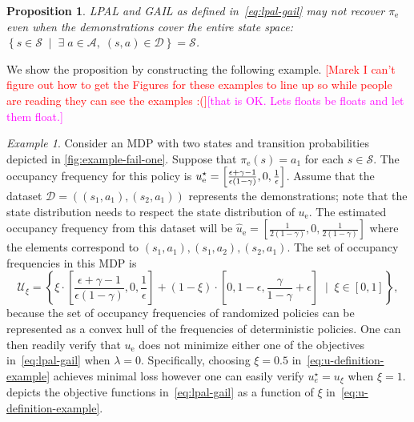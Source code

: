 \documentclass[10pt]{article}
\theoremstyle{plain}
\newtheorem{proposition}{Proposition}
\theoremstyle{remark}
\newtheorem{example}{Example}
\newcommand{\mm}[1]{\textcolor{magenta}{[#1]}}
\newcommand{\gersi}[1]{\textcolor{red}{[#1]}}
\begin{document}
\begin{proposition}
LPAL and GAIL as defined in~\eqref{eq:lpal-gail} may not recover $\pi_{\mathrm{e}}$ even when the demonstrations cover the entire state space: $ \left\{ s\in \mathcal{S} \; \mid \; \exists\; a\in \mathcal{A}, \; (s,a) \in \mathcal{D} \right\} = \mathcal{S}$. 
\end{proposition}
We show the proposition by constructing the following example.
\gersi{Marek I can't figure out how to get the Figures for these examples to line up so while people are reading they can see the examples :(}\mm{that is OK. Lets floats be floats and let them float.}
\begin{example} \label{exm:fail-all}
Consider an MDP with two states and transition probabilities depicted in \cref{fig:example-fail-one}. Suppose that $\pi_{\mathrm{e}}(s) = a_1$ for each $s\in \mathcal{S}$.  The occupancy frequency for this policy is $u^{\mathnormal{\star}}_{\mathrm{e}} = \left[ \frac{\epsilon + \gamma - 1}{\epsilon(1-\gamma)}, 0, \frac{1}{\epsilon}\right]$. Assume that the dataset $\mathcal{D} = ( (s_1, a_1), (s_2, a_1) )$ represents the demonstrations; note that the state distribution needs to respect the state distribution of $u_{\mathrm{e}}$. The estimated occupancy frequency from this dataset will be $\hat{u}_{\mathrm{e}} = \left[\frac{1}{2(1-\gamma)}, 0, \frac{1}{2(1-\gamma)}\right]$ where the elements correspond to $(s_1, a_1), (s_1, a_2), (s_2,a_1)$. The set of occupancy frequencies in this MDP is
\begin{equation} \label{eq:u-definition-example}
  \mathcal{U}_\xi = \left\{ \xi \cdot \left[\frac{\epsilon+\gamma-1}{\epsilon(1-\gamma)}, 0, \frac{1}{\epsilon}\right] + (1-\xi) \cdot \left[0,1-\epsilon,\frac{\gamma}{1-\gamma}+\epsilon\right] \;\mid\; \xi \in [0,1]\right\},
\end{equation}
because the set of occupancy frequencies of randomized policies can be represented as a convex hull of the frequencies of deterministic policies. One can then readily verify that $u_{\mathrm{e}}$ does not minimize either one of the objectives in~\eqref{eq:lpal-gail} when $\lambda = 0$. Specifically, choosing $\xi = 0.5$ in~\eqref{eq:u-definition-example} achieves minimal loss however one can easily verify $u^\star_e = u_\xi$ when $\xi = 1$.  depicts the objective functions in~\eqref{eq:lpal-gail} as a function of $\xi$ in~\eqref{eq:u-definition-example}.
\end{example}
\end{document}
